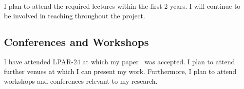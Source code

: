 \documentclass{article}
\theoremstyle{definition}
\theoremstyle{definition}
\theoremstyle{definition}
\theoremstyle{definition}
\theoremstyle{definition}
\theoremstyle{definition}
\theoremstyle{definition}
\newcommand{\0}{\mathbf 0}
\newcommand{\1}{\mathbf 1}
\begin{document}
	I plan to attend the required lectures within the first 2 years. I will continue to be involved in teaching throughout the project.

	\subsection{Conferences and Workshops}

	I have attended LPAR-24 at which my paper~\cite{pluska2023embedding} was accepted. I plan to attend further venues at which I can present my work. Furthermore, I plan to attend workshops and conferences relevant to my research.

	
	
	
\end{document}
